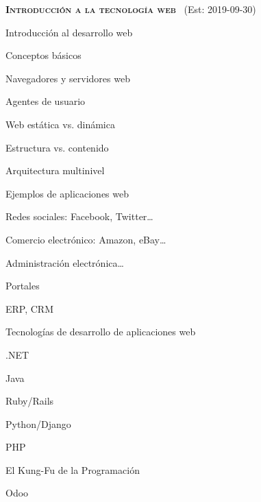 \begin{longenum}
\begin{longenum}
\begin{longenum}
\begin{longenum}
\begin{longenum}
                \end{longenum}
            \end{longenum}
        \end{longenum}
    \end{longenum}
    \item \textbf{\textsc{Introducción a la tecnología web}} \ (Est: 2019-09-30)
    \begin{longenum}
        \item Introducción al desarrollo web
        \begin{longenum}
            \item Conceptos básicos
            \begin{longenum}
                \item Navegadores y servidores web
                \item Agentes de usuario
                \item Web estática vs. dinámica
                \item Estructura vs. contenido
                \item Arquitectura multinivel
            \end{longenum}
            \item Ejemplos de aplicaciones web
            \begin{longenum}
                \item Redes sociales: Facebook, Twitter…
                \item Comercio electrónico: Amazon, eBay…
                \item Administración electrónica…
                \item Portales
                \item ERP, CRM
            \end{longenum}
            \item Tecnologías de desarrollo de aplicaciones web
            \begin{longenum}
                \item .NET
                \item Java
                \item Ruby/Rails
                \item Python/Django
                \item PHP
                \item El Kung-Fu de la Programación
                \begin{longenum}
                    \item Odoo

\end{longenum}
\end{longenum}
\end{longenum}
\end{longenum}
\end{longenum}
